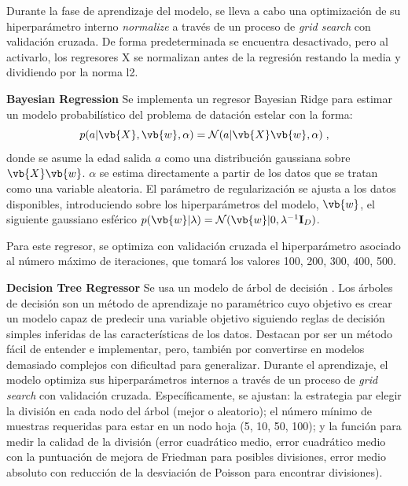 Durante la fase de aprendizaje del modelo, se lleva a cabo una optimización de su hiperparámetro interno \emph{normalize} a través de un proceso de \emph{grid search} con validación cruzada. De forma predeterminada se encuentra desactivado, pero al activarlo, los regresores X se normalizan antes de la regresión restando la media y dividiendo por la norma l2.

\vspace{0.5cm}

\textbf{Bayesian Regression} {} Se implementa un regresor Bayesian Ridge para estimar un modelo probabilístico del problema de datación estelar con la forma:
\begin{equation}
p(a|\vb{X},\vb{w},\alpha) = \mathcal{N}(a|\vb{X} \vb{w},\alpha)\; ,
\end{equation}
donde se asume la edad salida $a$ como una distribución gaussiana sobre $\vb{X}\vb{w}$. $\alpha$ se estima directamente a partir de los datos que se tratan como una variable aleatoria. El parámetro de regularización se ajusta a los datos disponibles, introduciendo sobre los hiperparámetros del modelo, \ie $\vb{w}$, el siguiente gaussiano esférico $p(\vb{w}|\lambda) =
\mathcal{N}(\vb{w}|0,\lambda^{-1}\mathbf{I}_{D})$.

Para este regresor, se optimiza con validación cruzada el hiperparámetro asociado al número máximo de iteraciones, que tomará los valores 100, 200, 300, 400, 500.

\vspace{0.5cm}

\textbf{Decision Tree Regressor} {} Se usa un modelo de árbol de decisión \cite{Breiman1984}. %
Los árboles de decisión son un método de aprendizaje no paramétrico cuyo objetivo es crear un modelo capaz de predecir una variable objetivo siguiendo reglas de decisión simples inferidas de las características de los datos. Destacan por ser un método fácil de entender e implementar, pero, también por convertirse en modelos demasiado complejos con dificultad para generalizar.
Durante el aprendizaje, el modelo optimiza sus hiperparámetros internos a través de un proceso de \emph{grid search} con validación cruzada. Específicamente, se ajustan: la estrategia par elegir la división en cada nodo del árbol (mejor o aleatorio); el número mínimo de muestras requeridas para estar en un nodo hoja (5, 10, 50, 100); y la función para medir la calidad de la división (error cuadrático medio, error cuadrático medio con la puntuación de mejora de Friedman para posibles divisiones, error medio absoluto con reducción de la desviación de Poisson para encontrar divisiones). 

